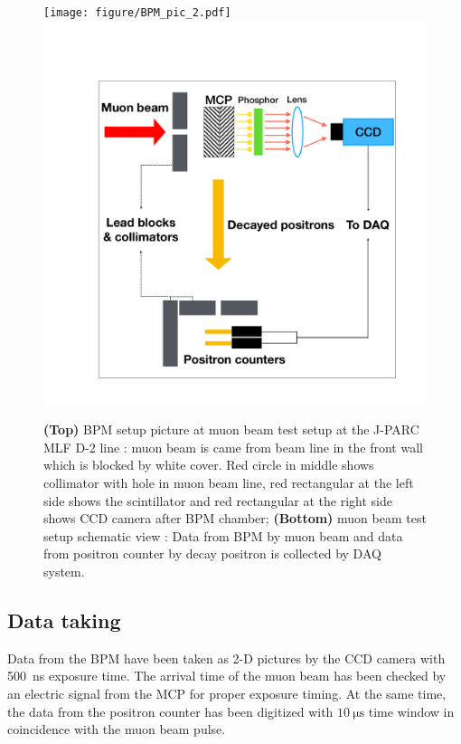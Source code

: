 \documentclass[preprint,3p,twocolumn]{elsarticle}
\begin{document}
\begin{figure}[htb]
{\setlength{\belowdisplayskip}{0pt}
\begin{minipage}[t]{60mm}
\texttt{[image: figure/BPM\_pic\_2.pdf]}
\includegraphics[width=1.25\textwidth, height=0.97\textwidth]{figure/BPM_schematic_2.pdf}
\end{minipage}
}\vspace{-0.7cm}
\caption{{\bf (Top)} BPM setup picture at muon beam test setup at the J-PARC MLF D-2 line : muon beam is came from beam line in the front wall which is blocked by white cover. Red circle in middle shows collimator with hole in muon beam line, red rectangular at the left side shows the scintillator and red rectangular at the right side shows CCD camera after BPM chamber; {\bf (Bottom)} muon beam test setup schematic view : Data from BPM by muon beam and data from positron counter by decay positron is collected by DAQ system.}
\vspace{-0.4cm}
\label{fig:simulation}
\end{figure}
\subsection{Data taking} 

Data from the BPM have been taken as 2-D pictures by the CCD camera with \SI{500}{\nano\s} exposure time.
The arrival time of the muon beam has been checked by an electric signal from the MCP for proper exposure timing. At the same time, the data from the positron counter has been digitized with $\SI{10}{\micro\s}$ time window in coincidence with the muon beam pulse.
\end{document}
